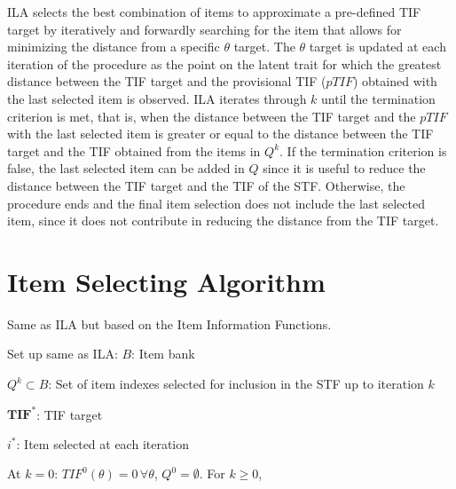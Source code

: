 \documentclass[12pt, a4paper, titilepage]{article}
\begin{document}
ILA selects the best combination of items to approximate a pre-defined TIF target by iteratively and forwardly searching for the item that allows for minimizing the distance from a specific $\theta$ target. The $\theta$ target is updated at each iteration of the procedure as the point on the latent trait for which the greatest distance between the TIF target and the provisional TIF ($pTIF$) obtained with the last selected item is observed. 
ILA iterates through $k$ until the termination criterion is met, that is, when the distance between the TIF target and the $pTIF$ with the last selected item is greater or equal to the distance between the TIF target and the TIF obtained from the items in $Q^k$. If the termination criterion is false, the last selected item can be added in $Q$ since it is useful to reduce the distance between the TIF target and the TIF of the STF. Otherwise, the procedure ends and the final item selection does not include the last selected item, since it does not contribute in reducing the distance from the TIF target.  

\section{Item Selecting Algorithm}

Same as ILA but based on the Item Information Functions. 

\color{blue}

Set up same as ILA: 
$B$: Item bank 


$Q^k \subset B$: Set of item indexes selected for inclusion in the STF up to iteration $k$

$\mathbf{TIF}^*$: TIF target 

$i^*$: Item selected at each iteration



\normalcolor

At $k = 0$: $TIF^0(\theta) = 0 \, \forall \theta$, $Q^0 = \emptyset$. For $k \geq 0$,
\end{document}
